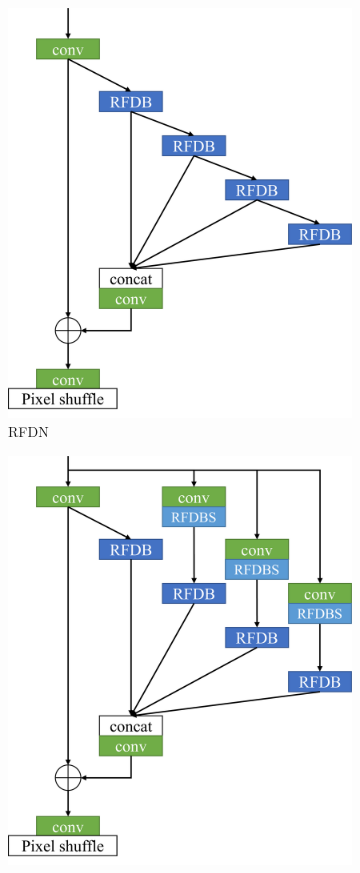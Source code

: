 \documentclass{article}
\begin{document}
\begin{figure}
    \centering
    \begin{subfigure}[b]{0.49\linewidth}
		\centering
        \includegraphics[width=\textwidth]{../RFDN.pdf}
        \caption{RFDN}
        \label{fig:RFDN}
    \end{subfigure}
    \begin{subfigure}[b]{0.49\linewidth}
		\centering
        \includegraphics[width=\textwidth]{../Branching.pdf}

\end{subfigure}
\end{figure}
\end{document}
